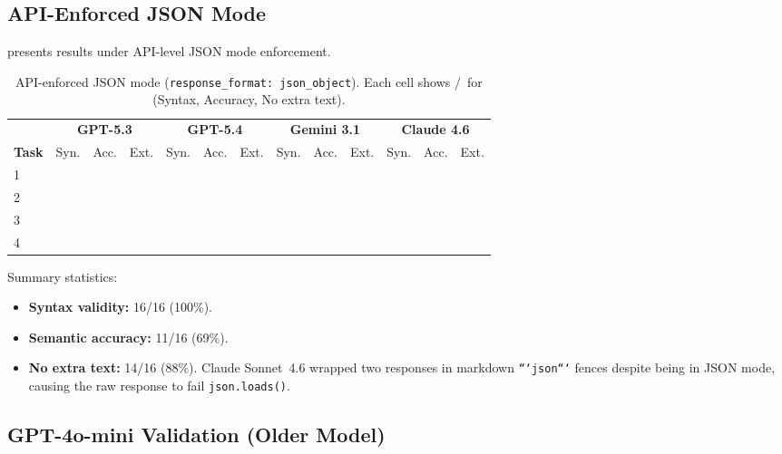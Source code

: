 \documentclass[11pt, letterpaper]{article}
\newcommand{\cmark}{\ding{51}}  %
\newcommand{\xmark}{\ding{55}}  %
\begin{document}
\subsection{API-Enforced JSON Mode}
\label{sec:json_results}

 presents results under API-level JSON mode enforcement.

\begin{table}[H]
\centering
\caption{API-enforced JSON mode (\texttt{response\_format: json\_object}). Each cell shows \cmark/\xmark\ for (Syntax, Accuracy, No extra text).}
\label{tab:json_enforced}
\begin{tabular}{l*{4}{ccc}}
\toprule
 & \multicolumn{3}{c}{\textbf{GPT-5.3}} & \multicolumn{3}{c}{\textbf{GPT-5.4}} & \multicolumn{3}{c}{\textbf{Gemini 3.1}} & \multicolumn{3}{c}{\textbf{Claude 4.6}} \\
\cmidrule(lr){2-4} \cmidrule(lr){5-7} \cmidrule(lr){8-10} \cmidrule(lr){11-13}
\textbf{Task} & Syn. & Acc. & Ext. & Syn. & Acc. & Ext. & Syn. & Acc. & Ext. & Syn. & Acc. & Ext. \\
\midrule
1 & \cmark & \xmark & \xmark & \cmark & \cmark & \cmark & \cmark & \cmark & \cmark & \cmark & \xmark & \xmark \\
2 & \cmark & \xmark & \cmark & \cmark & \cmark & \cmark & \cmark & \xmark & \cmark & \cmark & \xmark & \cmark \\
3 & \cmark & \cmark & \cmark & \cmark & \cmark & \cmark & \cmark & \cmark & \cmark & \cmark & \cmark & \cmark \\
4 & \cmark & \cmark & \cmark & \cmark & \xmark & \cmark & \cmark & \cmark & \cmark & \cmark & \cmark & \cmark \\
\bottomrule
\end{tabular}
\end{table}

\noindent Summary statistics:
\begin{itemize}[leftmargin=*]
    \item \textbf{Syntax validity:} 16/16 (100\%).
    \item \textbf{Semantic accuracy:} 11/16 (69\%).
    \item \textbf{No extra text:} 14/16 (88\%). Claude Sonnet~4.6 wrapped two responses in markdown \texttt{```json```} fences despite being in JSON mode, causing the raw response to fail \texttt{json.loads()}.
\end{itemize}

\subsection{GPT-4o-mini Validation (Older Model)}
\label{sec:gpt4omini}
\end{document}
